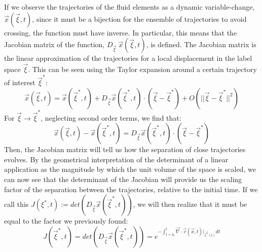 \documentclass[11pt, a4paper]{article} %
\begin{document}
{If we observe the trajectories of the fluid elements as a dynamic variable-change, $\vec{x}(\vec{\xi},t)$, since it must be a bijection for the ensemble of trajectories to avoid crossing, the function must have inverse. In particular, this means that the Jacobian matrix of the function, $D_{\vec{\xi}}\ \vec{x}(\vec{\xi},t)$, is defined. The Jacobian matrix is the linear approximation of the trajectories for a local displacement in the label space $\vec{\xi}$. This can be seen using the Taylor expansion around a certain trajectory of interest $\vec{\xi}^*$:
\begin{equation}
\vec{x}(\vec{\xi},t)=\vec{x}(\vec{\xi}^*,t)+D_{\vec{\xi}}\vec{x}(\vec{\xi}^*,t)\cdot (\vec{\xi}-\vec{\xi}^*)+O(||\vec{\xi}-\vec{\xi}^*||^2)
\end{equation}
For $\vec{\xi}\rightarrow \vec{\xi}^*$, neglecting second order terms, we find that:
\begin{equation}
\vec{x}(\vec{\xi},t)-\vec{x}(\vec{\xi}^*,t)=D_{\vec{\xi}}\vec{x}(\vec{\xi}^*,t)\cdot (\vec{\xi}-\vec{\xi}^*)
\end{equation}
Then, the Jacobian matrix will tell us how the separation of close trajectories evolves. By the geometrical interpretation of the determinant of a linear application as the magnitude by which the unit volume of the space is scaled, we can now see that the determinant of the Jacobian will provide us the scaling factor of the separation between the trajectories, relative to the initial time. If we call this $J(\xi^*,t):=det(D_{\vec{\xi}}\vec{x}(\vec{\xi}^*,t))$, we will then realize that it must be equal to the factor we previously found:
\begin{equation}
J(\vec{\xi}^*,t)=det(D_{\vec{\xi}}\vec{x}(\vec{\xi}^*,t))=e^{-\int_{t=t_0}^t \vec{\nabla}\cdot \vec{v}(\vec{x},t)\rvert_{\vec{x}^\xi(t)} dt}
\end{equation}}
\end{document}
